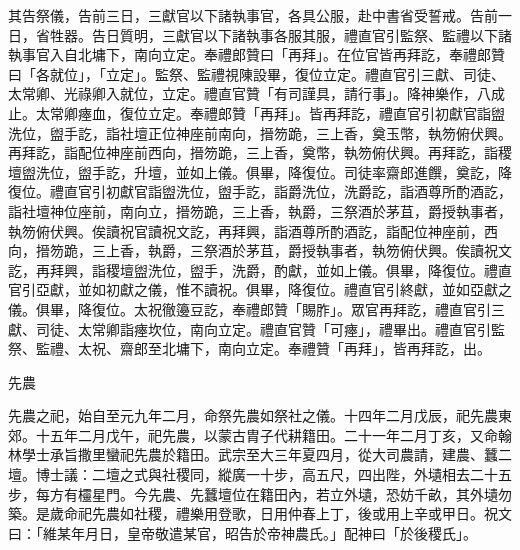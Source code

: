 \begin{pinyinscope}
 其告祭儀，告前三日，三獻官以下諸執事官，各具公服，赴中書省受誓戒。告前一日，省牲器。告日質明，三獻官以下諸執事各服其服，禮直官引監祭、監禮以下諸執事官入自北墉下，南向立定。奉禮郎贊曰「再拜」。在位官皆再拜訖，奉禮郎贊曰「各就位」，「立定」。監祭、監禮視陳設畢，復位立定。禮直官引三獻、司徒、太常卿、光祿卿入就位，立定。禮直官贊「有司謹具，請行事」。降神樂作，八成止。太常卿瘞血，復位立定。奉禮郎贊「再拜」。皆再拜訖，禮直官引初獻官詣盥洗位，盥手訖，詣社壇正位神座前南向，搢笏跪，三上香，奠玉幣，執笏俯伏興。再拜訖，詣配位神座前西向，搢笏跪，三上香，奠幣，執笏俯伏興。再拜訖，詣稷壇盥洗位，盥手訖，升壇，並如上儀。俱畢，降復位。司徒率齋郎進饌，奠訖，降復位。禮直官引初獻官詣盥洗位，盥手訖，詣爵洗位，洗爵訖，詣酒尊所酌酒訖，詣社壇神位座前，南向立，搢笏跪，三上香，執爵，三祭酒於茅苴，爵授執事者，執笏俯伏興。俟讀祝官讀祝文訖，再拜興，詣酒尊所酌酒訖，詣配位神座前，西向，搢笏跪，三上香，執爵，三祭酒於茅苴，爵授執事者，執笏俯伏興。俟讀祝文訖，再拜興，詣稷壇盥洗位，盥手，洗爵，酌獻，並如上儀。俱畢，降復位。禮直官引亞獻，並如初獻之儀，惟不讀祝。俱畢，降復位。禮直官引終獻，並如亞獻之儀。俱畢，降復位。太祝徹籩豆訖，奉禮郎贊「賜胙」。眾官再拜訖，禮直官引三獻、司徒、太常卿詣瘞坎位，南向立定。禮直官贊「可瘞」，禮畢出。禮直官引監祭、監禮、太祝、齋郎至北墉下，南向立定。奉禮贊「再拜」，皆再拜訖，出。



 先農



 先農之祀，始自至元九年二月，命祭先農如祭社之儀。十四年二月戊辰，祀先農東郊。十五年二月戊午，祀先農，以蒙古胄子代耕籍田。二十一年二月丁亥，又命翰林學士承旨撒里蠻祀先農於籍田。武宗至大三年夏四月，從大司農請，建農、蠶二壇。博士議：二壇之式與社稷同，縱廣一十步，高五尺，四出陛，外壝相去二十五步，每方有欞星門。今先農、先蠶壇位在籍田內，若立外壝，恐妨千畝，其外壝勿築。是歲命祀先農如社稷，禮樂用登歌，日用仲春上丁，後或用上辛或甲日。祝文曰：「維某年月日，皇帝敬遣某官，昭告於帝神農氏。」配神曰「於後稷氏」。




\end{pinyinscope}
